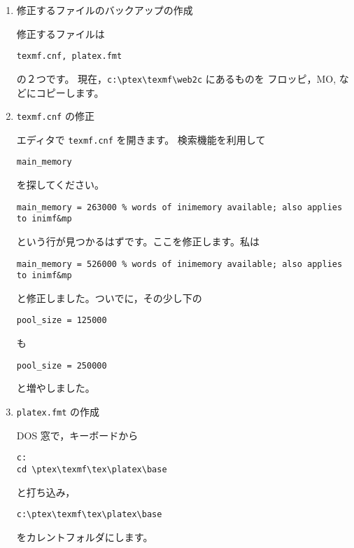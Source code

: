 \documentclass[fleqn,a4j]{jarticle}
\begin{document}
\begin{enumerate}[(1)]
\item 修正するファイルのバックアップの作成

    修正するファイルは
    \begin{jquote}
        \verb/texmf.cnf, platex.fmt/
    \end{jquote}
    の２つです。
    現在，\verb/c:\ptex\texmf\web2c/ にあるものを
    フロッピ，MO, などにコピーします。

\item \verb/texmf.cnf/ の修正

    エディタで \verb/texmf.cnf/ を開きます。
    検索機能を利用して
    \begin{jquote}
        \verb/main_memory/
    \end{jquote}
    を探してください。%
\begin{verbatim}
main_memory = 263000 % words of inimemory available; also applies to inimf&mp
\end{verbatim}
    という行が見つかるはずです。ここを修正します。私は%
\begin{verbatim}
main_memory = 526000 % words of inimemory available; also applies to inimf&mp
\end{verbatim}
と修正しました。ついでに，その少し下の%
\begin{verbatim}
pool_size = 125000
\end{verbatim}
も%
\begin{verbatim}
pool_size = 250000
\end{verbatim}
と増やしました。

\item \verb/platex.fmt/ の作成

    DOS 窓で，キーボードから
    \begin{jquote}%
\begin{verbatim}
c:
cd \ptex\texmf\tex\platex\base
\end{verbatim}
    \end{jquote}
    と打ち込み，
    \begin{jquote}%
\begin{verbatim}
c:\ptex\texmf\tex\platex\base
\end{verbatim}
    \end{jquote}
    をカレントフォルダにします。


\end{enumerate}
\end{document}
